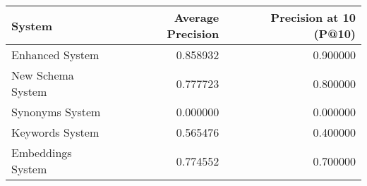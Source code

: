 \begin{tabular}{lrr}
\toprule
System & Average Precision & Precision at 10 (P@10) \\
\midrule
Enhanced System & 0.858932 & 0.900000 \\
New Schema System & 0.777723 & 0.800000 \\
Synonyms System & 0.000000 & 0.000000 \\
Keywords System & 0.565476 & 0.400000 \\
Embeddings System & 0.774552 & 0.700000 \\
\bottomrule
\end{tabular}
